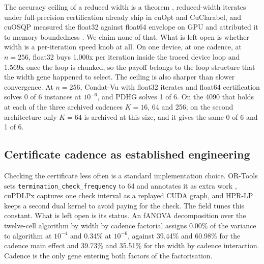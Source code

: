 The accuracy ceiling of a reduced width is a theorem
\citep{CarsonHigham2018,Brisebarre2026}, reduced-width iterates under
full-precision certification already ship in cuOpt and CuClarabel, and cuOSQP
measured the float32 against float64 envelope on GPU and attributed it to memory
boundedness \citep{cuOpt2026,CuClarabel2024,LiangYang2026,cuOSQP2020,Stellato2020OSQP,Goulart2024Clarabel}.
We claim none of that. What is left open is whether width is a per-iteration
speed knob at all.
On one device, at one cadence, at $n=256$, float32 buys 1.000x per iteration
inside the traced device loop and 1.569x once the loop is chunked, so the payoff
belongs to the loop structure that the width gene happened to select.
The ceiling is also sharper than slower convergence. At $n=256$, Condat-Vu with
float32 iterates and float64 certification solves 0 of 6 instances at
$10^{-6}$, and PDHG solves 1 of 6. On the 4090 that holds at each of the three
archived cadences $K=16$, 64 and 256; on the second architecture only $K=64$ is
archived at this size, and it gives the same 0 of 6 and 1 of 6.

\subsection{Certificate cadence as established engineering}

Checking the certificate less often is a standard implementation choice.
OR-Tools sets \texttt{termination\_check\_frequency} to 64 and annotates it as
extra work \citep{ORToolsPDLP2026}, cuPDLPx captures one check interval as a
replayed CUDA graph, and HPR-LP keeps a second dual kernel to avoid paying for
the check. The field tunes this constant. What is left open is its status.
An fANOVA decomposition \citep{Hutter2014fANOVA} over the twelve-cell algorithm
by width by cadence factorial assigns 0.00\% of the variance to algorithm at
$10^{-4}$ and 0.34\% at $10^{-6}$, against 39.44\% and 60.98\% for the cadence
main effect and 39.73\% and 35.51\% for the width by cadence interaction.
Cadence is the only gene entering both factors of the factorisation.


